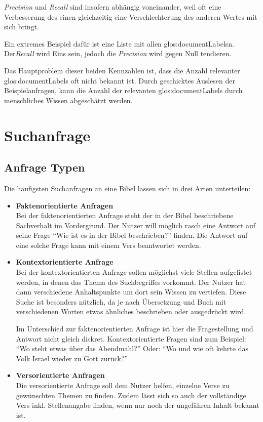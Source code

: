 \textit{Precision} und \textit{Recall} sind insofern abhängig voneinander, weil oft eine Verbesserung des einen gleichzeitig eine Verschlechterung des anderen Wertes mit sich bringt.

Ein extremes Beispiel dafür ist eine Liste mit allen \glspl{glos:documentLabel}n. Der\textit{Recall} wird Eins sein, jedoch die \textit{Precision} wird gegen Null tendieren.

Das Hauptproblem dieser beiden Kennzahlen ist, dass die Anzahl relevanter \glspl{glos:documentLabel} oft nicht bekannt ist. 
Durch geschicktes Auslesen der Beispielanfragen, kann die Anzahl der relevanten \glspl{glos:documentLabel} durch menschliches Wissen abgeschätzt werden.



\section{Suchanfrage}

\subsection{Anfrage Typen}
Die häufigsten Suchanfragen an eine Bibel lassen sich in drei Arten unterteilen:
\begin{itemize}[noitemsep]
	\item \textbf{Faktenorientierte Anfragen}\\
		Bei der faktenorientierten Anfrage steht der in der Bibel beschriebene Sachverhalt im Vordergrund. Der Nutzer will möglich rasch eine Antwort auf seine Frage "`Wie ist es in der Bibel beschrieben?"' finden.
		Die Antwort auf eine solche Frage kann mit einem Vers beantwortet werden.
		
	\item \textbf{Kontextorientierte Anfrage}\\
		Bei der kontextorientierten Anfrage sollen möglichst viele Stellen aufgelistet werden, in denen das Thema des Suchbegriffes vorkommt. Der Nutzer hat dann verschiedene Anhaltspunkte um dort sein Wissen zu vertiefen.
		Diese Suche ist besonders nützlich, da je nach Übersetzung und Buch mit verschiedenen Worten etwas ähnliches beschrieben oder ausgedrückt wird.
		
		Im Unterschied zur faktenorientierten Anfrage ist hier die Fragestellung und Antwort nicht gleich diskret. Kontextorientierte Fragen sind zum Beispiel: "`Wo steht etwas über das Abendmahl?"' Oder: "`Wo und wie oft kehrte das Volk Israel wieder zu Gott zurück?"'
		
	\item \textbf{Versorientierte Anfragen}\\
		Die versorientierte Anfrage soll dem Nutzer helfen, einzelne Verse zu gewünschten Themen zu finden.
		Zudem lässt sich so auch der vollständige Vers inkl. Stellenangabe finden, wenn nur noch der ungefähren Inhalt bekannt ist.
		
\end{itemize}


